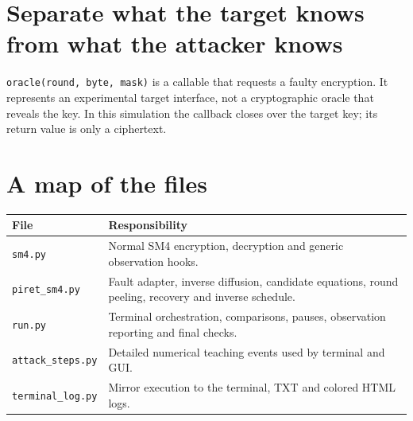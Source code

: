\documentclass[11pt,a4paper]{report}
\begin{document}
\section{Separate what the target knows from what the attacker knows}
\begin{center}
\end{center}
\texttt{oracle(round, byte, mask)} is a callable that requests a faulty encryption. It represents an experimental target interface, not a cryptographic oracle that reveals the key. In this simulation the callback closes over the target key; its return value is only a ciphertext.

\section{A map of the files}
\begin{center}\begin{tabular}{p{42mm}p{105mm}}\toprule
File&Responsibility\\\midrule
\texttt{sm4.py}&Normal SM4 encryption, decryption and generic observation hooks.\\
\texttt{piret\_sm4.py}&Fault adapter, inverse diffusion, candidate equations, round peeling, recovery and inverse schedule.\\
\texttt{run.py}&Terminal orchestration, comparisons, pauses, observation reporting and final checks.\\
\texttt{attack\_steps.py}&Detailed numerical teaching events used by terminal and GUI.\\
\texttt{terminal\_log.py}&Mirror execution to the terminal, TXT and colored HTML logs.\\\bottomrule
\end{tabular}\end{center}
\end{document}
